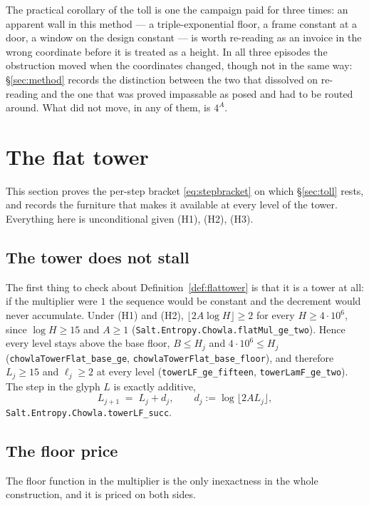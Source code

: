 \documentclass[11pt]{amsart}
\newcommand{\leaninline}[1]{{\small\texttt{#1}}}
\theoremstyle{remark}
\begin{document}
The practical corollary of the toll is one the campaign paid for three
times: an apparent wall in this method --- a triple-exponential floor, a
frame constant at a door, a window on the design constant --- is worth
re-reading as an invoice in the wrong coordinate before it is treated as a
height. In all three episodes the obstruction moved when the coordinates
changed, though not in the same way: \S\ref{sec:method} records the
distinction between the two that dissolved on re-reading and the one
that was proved impassable as posed and had to be routed around. What
did not move, in any of them, is $4^{A}$.

\section{The flat tower}\label{sec:flat}

This section proves the per-step bracket \eqref{eq:stepbracket} on which
\S\ref{sec:toll} rests, and records the furniture that makes it available
at every level of the tower. Everything here is unconditional given (H1),
(H2), (H3).

\subsection{The tower does not stall}
The first thing to check about Definition~\ref{def:flattower} is that it
is a tower at all: if the multiplier were $1$ the sequence would be
constant and the decrement would never accumulate. Under (H1) and (H2),
$\lfloor 2A\log H\rfloor \ge 2$ for every $H \ge 4\cdot10^{6}$, since
$\log H \ge 15$ and $A \ge 1$
(\leaninline{Salt.Entropy.Chowla.flatMul\_ge\_two}). Hence every level
stays above the base floor,
$B \le H_j$ and $4\cdot10^{6}\le H_j$
(\leaninline{chowlaTowerFlat\_base\_ge}, \leaninline{chowlaTowerFlat\_base\_floor}),
and therefore $L_j \ge 15$ and $\ell_j \ge 2$ at every level
(\leaninline{towerLF\_ge\_fifteen}, \leaninline{towerLamF\_ge\_two}). The
step in the glyph $L$ is exactly additive,
\[
L_{j+1} \;=\; L_j + d_j, \qquad d_j := \log\bigl\lfloor 2A L_j\bigr\rfloor ,
\]
\leaninline{Salt.Entropy.Chowla.towerLF\_succ}.

\subsection{The floor price}
The floor function in the multiplier is the only inexactness in the whole
construction, and it is priced on both sides.
\end{document}
